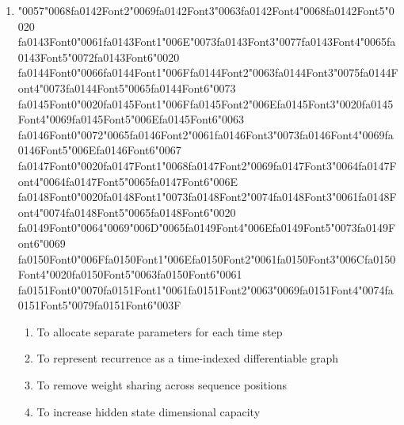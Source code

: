 \documentclass[12pt]{article}
\begin{document}
\begin{enumerate}[label=Q\arabic*.]
 \item {\char"0057}{\char"0068}{\csname fa0142Font2\endcsname\char"0069}{\csname fa0142Font3\endcsname\char"0063}{\csname fa0142Font4\endcsname\char"0068}{\csname fa0142Font5\endcsname\char"0020} {\csname fa0143Font0\endcsname\char"0061}{\csname fa0143Font1\endcsname\char"006E}{\char"0073}{\csname fa0143Font3\endcsname\char"0077}{\csname fa0143Font4\endcsname\char"0065}{\csname fa0143Font5\endcsname\char"0072}{\csname fa0143Font6\endcsname\char"0020} {\csname fa0144Font0\endcsname\char"0066}{\csname fa0144Font1\endcsname\char"006F}{\csname fa0144Font2\endcsname\char"0063}{\csname fa0144Font3\endcsname\char"0075}{\csname fa0144Font4\endcsname\char"0073}{\csname fa0144Font5\endcsname\char"0065}{\csname fa0144Font6\endcsname\char"0073} {\csname fa0145Font0\endcsname\char"0020}{\csname fa0145Font1\endcsname\char"006F}{\csname fa0145Font2\endcsname\char"006E}{\csname fa0145Font3\endcsname\char"0020}{\csname fa0145Font4\endcsname\char"0069}{\csname fa0145Font5\endcsname\char"006E}{\csname fa0145Font6\endcsname\char"0063} {\csname fa0146Font0\endcsname\char"0072}{\char"0065}{\csname fa0146Font2\endcsname\char"0061}{\csname fa0146Font3\endcsname\char"0073}{\csname fa0146Font4\endcsname\char"0069}{\csname fa0146Font5\endcsname\char"006E}{\csname fa0146Font6\endcsname\char"0067} {\csname fa0147Font0\endcsname\char"0020}{\csname fa0147Font1\endcsname\char"0068}{\csname fa0147Font2\endcsname\char"0069}{\csname fa0147Font3\endcsname\char"0064}{\csname fa0147Font4\endcsname\char"0064}{\csname fa0147Font5\endcsname\char"0065}{\csname fa0147Font6\endcsname\char"006E} {\csname fa0148Font0\endcsname\char"0020}{\csname fa0148Font1\endcsname\char"0073}{\csname fa0148Font2\endcsname\char"0074}{\csname fa0148Font3\endcsname\char"0061}{\csname fa0148Font4\endcsname\char"0074}{\csname fa0148Font5\endcsname\char"0065}{\csname fa0148Font6\endcsname\char"0020} {\csname fa0149Font0\endcsname\char"0064}{\char"0069}{\char"006D}{\char"0065}{\csname fa0149Font4\endcsname\char"006E}{\csname fa0149Font5\endcsname\char"0073}{\csname fa0149Font6\endcsname\char"0069} {\csname fa0150Font0\endcsname\char"006F}{\csname fa0150Font1\endcsname\char"006E}{\csname fa0150Font2\endcsname\char"0061}{\csname fa0150Font3\endcsname\char"006C}{\csname fa0150Font4\endcsname\char"0020}{\csname fa0150Font5\endcsname\char"0063}{\csname fa0150Font6\endcsname\char"0061} {\csname fa0151Font0\endcsname\char"0070}{\csname fa0151Font1\endcsname\char"0061}{\csname fa0151Font2\endcsname\char"0063}{\char"0069}{\csname fa0151Font4\endcsname\char"0074}{\csname fa0151Font5\endcsname\char"0079}{\csname fa0151Font6\endcsname\char"003F}
 \begin{enumerate}[label=(\Alph*)]
     \item To allocate separate parameters for each time step
     \item To represent recurrence as a time-indexed differentiable graph
     \item To remove weight sharing across sequence positions
     \item To increase hidden state dimensional capacity
 \end{enumerate}
 

\end{enumerate}
\end{document}
